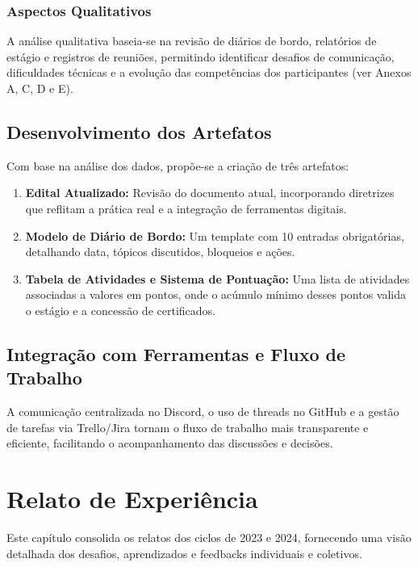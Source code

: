\subsection{Aspectos Qualitativos}
A análise qualitativa baseia-se na revisão de diários de bordo, relatórios de estágio e registros de reuniões, permitindo identificar desafios de comunicação, dificuldades técnicas e a evolução das competências dos participantes (ver Anexos A, C, D e E).

\section{Desenvolvimento dos Artefatos}
Com base na análise dos dados, propõe-se a criação de três artefatos:
\begin{enumerate}[label=\arabic*.]
    \item \textbf{Edital Atualizado:} Revisão do documento atual, incorporando diretrizes que reflitam a prática real e a integração de ferramentas digitais.
    \item \textbf{Modelo de Diário de Bordo:} Um template com 10 entradas obrigatórias, detalhando data, tópicos discutidos, bloqueios e ações.
    \item \textbf{Tabela de Atividades e Sistema de Pontuação:} Uma lista de atividades associadas a valores em pontos, onde o acúmulo mínimo desses pontos valida o estágio e a concessão de certificados.
\end{enumerate}

\section{Integração com Ferramentas e Fluxo de Trabalho}
A comunicação centralizada no Discord, o uso de threads no GitHub e a gestão de tarefas via Trello/Jira tornam o fluxo de trabalho mais transparente e eficiente, facilitando o acompanhamento das discussões e decisões.


\chapter{Relato de Experiência}
\label{chap:relato_experiencia}

Este capítulo consolida os relatos dos ciclos de 2023 e 2024, fornecendo uma visão detalhada dos desafios, aprendizados e feedbacks individuais e coletivos.

